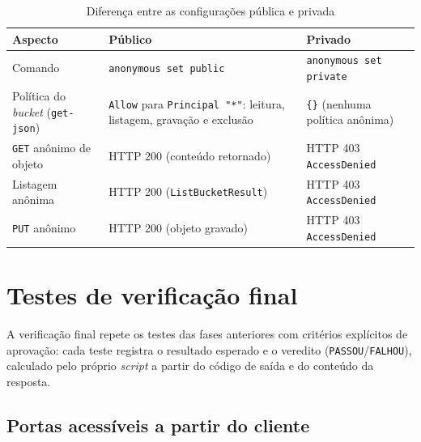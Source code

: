 \begin{table}[htbp]
  \centering
  \caption{Diferença entre as configurações pública e privada}\label{tab:publico-privado}
  \begin{tabular}{L{0.3\textwidth}L{0.3\textwidth}L{0.3\textwidth}}
    \hline
    \textbf{Aspecto} & \textbf{Público} & \textbf{Privado} \\
    \hline
    Comando & \texttt{anonymous set public} & \texttt{anonymous set private} \\
    Política do \textit{bucket} (\texttt{get-json}) & \texttt{Allow} para \texttt{Principal "*"}: leitura, listagem, gravação e exclusão & \texttt{\{\}} (nenhuma política anônima) \\
    \texttt{GET} anônimo de objeto & HTTP 200 (conteúdo retornado) & HTTP 403 \texttt{AccessDenied} \\
    Listagem anônima & HTTP 200 (\texttt{ListBucketResult}) & HTTP 403 \texttt{AccessDenied} \\
    \texttt{PUT} anônimo & HTTP 200 (objeto gravado) & HTTP 403 \texttt{AccessDenied} \\
    \hline
  \end{tabular}
\end{table}

\section{Testes de verificação final}\label{sec:verificacao}

A verificação final repete os testes das fases anteriores com critérios explícitos de
aprovação: cada teste registra o resultado esperado e o veredito
(\texttt{PASSOU}/\texttt{FALHOU}), calculado pelo próprio \textit{script} a partir do
código de saída e do conteúdo da resposta.

\subsection{Portas acessíveis a partir do cliente}



